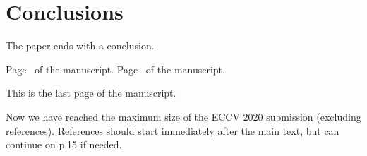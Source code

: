 \documentclass[runningheads]{llncs}
\begin{document}
\begin{table}
\centering
			
	\caption{Additional experiments to justify the design of our module with dense aggregation and arrangement of the dilation rate}
	\label{tab:additional_experiment}
\end{table}

\section{Conclusions}

The paper ends with a conclusion. 


\clearpage\mbox{}Page \thepage\ of the manuscript.
\clearpage\mbox{}Page \thepage\ of the manuscript.

This is the last page of the manuscript.
\par\vfill\par
Now we have reached the maximum size of the ECCV 2020 submission (excluding references).
References should start immediately after the main text, but can continue on p.15 if needed.

\clearpage
%
%


\end{document}
